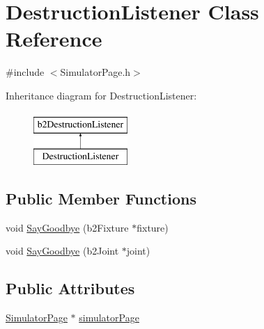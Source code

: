 \hypertarget{classDestructionListener}{\section{Destruction\-Listener Class Reference}
\label{classDestructionListener}
}


{\ttfamily \#include $<$Simulator\-Page.\-h$>$}

Inheritance diagram for Destruction\-Listener\-:\begin{figure}[H]
\begin{center}
\leavevmode
\includegraphics[height=2.000000cm]{classDestructionListener}
\end{center}
\end{figure}
\subsection*{Public Member Functions}
\begin{DoxyCompactItemize}
\item 
void \hyperlink{classDestructionListener_a51b3b045b48c33fbfaa0182b329d5d49}{Say\-Goodbye} (b2\-Fixture $\ast$fixture)
\item 
void \hyperlink{classDestructionListener_a55627bd55b8816d66e0f3d85a75c0552}{Say\-Goodbye} (b2\-Joint $\ast$joint)
\end{DoxyCompactItemize}
\subsection*{Public Attributes}
\begin{DoxyCompactItemize}
\item 
\hyperlink{classSimulatorPage}{Simulator\-Page} $\ast$ \hyperlink{classDestructionListener_a23c82561bcb7e2b9b9c9c71b46e4d62a}{simulator\-Page}
\end{DoxyCompactItemize}


